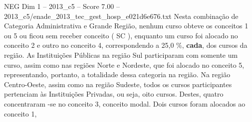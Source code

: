 \begin{textsample}{NEG Dim 1 – 2013\_c5 – Score 7.00 – 2013\_c5/enade\_2013\_tec\_gest\_hosp\_e021d6e676.txt}
Nesta combinação de Categoria Administrativa e Grande Região, nenhum curso obteve os conceitos 1 ou 5 ou ficou sem receber conceito ( SC ), enquanto um curso foi alocado no conceito 2 e outro no conceito 4, correspondendo a 25,0 \%, \textbf{cada}, dos cursos da região.
As Instituições Públicas na região Sul participaram com somente um curso, assim como nas regiões Norte e Nordeste, que foi alocado no conceito 5, representando, portanto, a totalidade dessa categoria na região.
Na região Centro-Oeste, assim como na região Sudeste, todos os cursos participantes pertenciam às Instituições Privadas, ou seja, oito cursos.
Destes, quatro concentraram -se no conceito 3, conceito modal.
Dois cursos foram alocados ao conceito 1,

\end{textsample}
